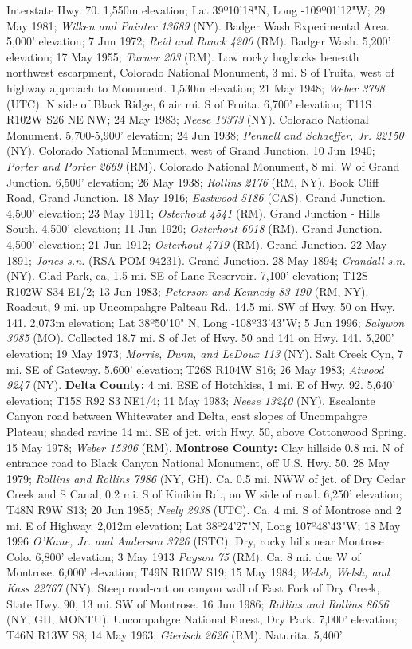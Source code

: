 Interstate Hwy. 70. 1,550m elevation; Lat 39º10'18"N, Long -109º01'12"W; 29 May 1981; \textit{Wilken and Painter 13689} (NY).  Badger Wash Experimental Area. 5,000' elevation; 7 Jun 1972; \textit{Reid and Ranck 4200} (RM).  Badger Wash. 5,200' elevation; 17 May 1955; \textit{Turner 203} (RM).  Low rocky hogbacks beneath northwest escarpment, Colorado National Monument, 3 mi. S of Fruita, west of highway approach to Monument. 1,530m elevation; 21 May 1948; \textit{Weber 3798} (UTC).  N side of Black Ridge, 6 air mi. S of Fruita. 6,700' elevation; T11S R102W S26 NE NW; 24 May 1983; \textit{Neese 13373} (NY).  Colorado National Monument. 5,700-5,900' elevation; 24 Jun 1938; \textit{Pennell and Schaeffer, Jr. 22150} (NY).  Colorado National Monument, west of Grand Junction. 10 Jun 1940; \textit{Porter and Porter 2669} (RM).  Colorado National Monument, 8 mi. W of Grand Junction. 6,500' elevation; 26 May 1938; \textit{Rollins 2176} (RM, NY).  Book Cliff Road, Grand Junction. 18 May 1916; \textit{Eastwood 5186} (CAS).  Grand Junction. 4,500' elevation; 23 May 1911; \textit{Osterhout 4541} (RM).  Grand Junction - Hills South. 4,500' elevation; 11 Jun 1920; \textit{Osterhout 6018} (RM).  Grand Junction. 4,500' elevation; 21 Jun 1912; \textit{Osterhout 4719} (RM).  Grand Junction. 22 May 1891; \textit{Jones s.n.} (RSA-POM-94231).  Grand Junction. 28 May 1894; \textit{Crandall s.n.} (NY).  Glad Park, ca, 1.5 mi. SE of Lane Reservoir. 7,100' elevation; T12S R102W S34 E1/2; 13 Jun 1983; \textit{Peterson and Kennedy 83-190} (RM, NY).  Roadcut, 9 mi. up Uncompahgre Palteau Rd., 14.5 mi. SW of Hwy. 50 on Hwy. 141. 2,073m elevation; Lat 38º50'10" N, Long -108º33'43"W; 5 Jun 1996; \textit{Salywon 3085} (MO).  Collected 18.7 mi. S of Jct of Hwy. 50 and 141 on Hwy. 141. 5,200' elevation; 19 May 1973; \textit{Morris, Dunn, and LeDoux 113} (NY).  Salt Creek Cyn, 7 mi. SE of Gateway. 5,600' elevation; T26S R104W S16; 26 May 1983; \textit{Atwood 9247} (NY).  \textbf{Delta County:} 4 mi. ESE of Hotchkiss, 1 mi. E of Hwy. 92. 5,640' elevation; T15S R92 S3 NE1/4; 11 May 1983; \textit{Neese 13240} (NY).  Escalante Canyon road between Whitewater and Delta, east slopes of Uncompahgre Plateau; shaded ravine 14 mi. SE of jct. with Hwy. 50, above Cottonwood Spring. 15 May 1978; \textit{Weber 15306} (RM).  \textbf{Montrose County:} Clay hillside 0.8 mi. N of entrance road to Black Canyon National Monument, off U.S. Hwy. 50. 28 May 1979; \textit{Rollins and Rollins 7986} (NY, GH).  Ca. 0.5 mi. NWW of jct. of Dry Cedar Creek and S Canal, 0.2 mi. S of Kinikin Rd., on W side of road. 6,250' elevation; T48N R9W S13; 20 Jun 1985; \textit{Neely 2938} (UTC).  Ca. 4 mi. S of Montrose and 2 mi. E of Highway. 2,012m elevation; Lat 38º24'27"N, Long 107º48'43"W; 18 May 1996 \textit{O'Kane, Jr. and Anderson 3726} (ISTC).  Dry, rocky hills near Montrose Colo. 6,800' elevation; 3 May 1913 \textit{Payson 75} (RM).  Ca. 8 mi. due W of Montrose. 6,000' elevation; T49N R10W S19; 15 May 1984; \textit{Welsh, Welsh, and Kass 22767} (NY).  Steep road-cut on canyon wall of East Fork of Dry Creek, State Hwy. 90, 13 mi. SW of Montrose. 16 Jun 1986; \textit{Rollins and Rollins 8636} (NY, GH, MONTU).  Uncompahgre National Forest, Dry Park. 7,000' elevation; T46N R13W S8; 14 May 1963; \textit{Gierisch 2626} (RM).  Naturita. 5,400' 